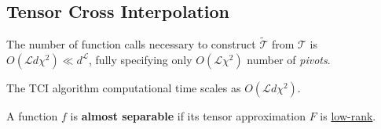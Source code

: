 \noindent{}\\

\noindent{}

\noindent{}


\subsection{Tensor Cross Interpolation}

The number of function calls necessary to construct $\widetilde{\mathcal{T}}$ from $\mathcal{T}$ is $O(\mathcal{L}d\chi^2) \ll d^\mathcal{L}$, fully specifying only $O(\mathcal{L}\chi^2)$ number of \textit{pivots}.

The TCI algorithm computational time scales as $O(\mathcal{L}d\chi^2)$. 

\begin{definition}
	A function $f$ is {\normalfont \textbf{almost separable}} if its tensor approximation $F$ is \underline{low-rank}.
	\label{def:separfunc}
\end{definition}


